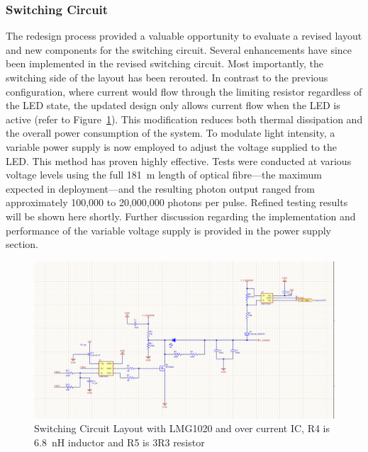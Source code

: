 \documentclass[a4paper,11pt]{article}
\begin{document}



\subsubsection{Switching Circuit}


The redesign process provided a valuable opportunity to evaluate a revised layout and new components for the switching circuit. 
Several enhancements have since been implemented in the revised switching circuit. Most importantly, the switching side of the layout has been rerouted. In contrast to the previous configuration, where current would flow through the limiting resistor regardless of the LED state, the updated design only allows current flow when the LED is active (refer to Figure~\ref{fig:Switching circuit}). This modification reduces both thermal dissipation and the overall power consumption of the system.
To modulate light intensity, a variable power supply is now employed to adjust the voltage supplied to the LED. This method has proven highly effective. Tests were conducted at various voltage levels using the full 181~m length of optical fibre—the maximum expected in deployment—and the resulting photon output ranged from approximately 100,000 to 20,000,000 photons per pulse. Refined testing results will be shown here shortly.
Further discussion regarding the implementation and performance of the variable voltage supply is provided in the power supply section. 


\begin{figure}[htbp]
\centering
\includegraphics[scale=0.5]{Switching circuit.png}
\caption{Switching Circuit Layout with LMG1020 and over current IC, R4 is 6.8~nH inductor and R5 is 3R3 resistor\label{fig:Switching circuit}}
\end{figure}
\end{document}
